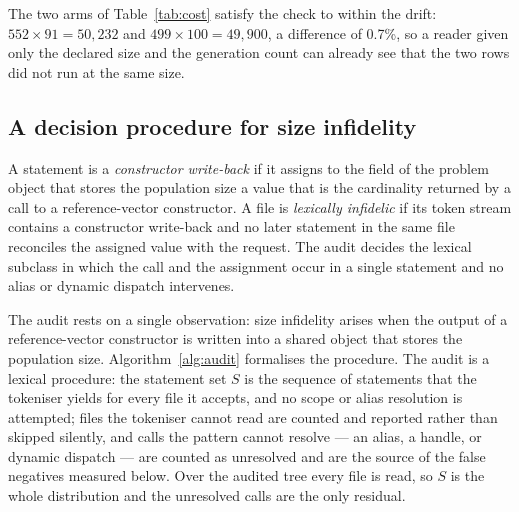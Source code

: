 \documentclass{SCIS2026}
\begin{document}
The two arms of Table~\ref{tab:cost} satisfy the check to within the drift: $552\times91=50{,}232$ and $499\times100=49{,}900$, a difference of 0.7\%, so a reader given only the declared size and the generation count can already see that the two rows did not run at the same size.

\subsection{A decision procedure for size infidelity}
\begin{definition}\label{def:pattern}
A statement is a \emph{constructor write-back} if it assigns to the field of the problem object that stores the population size a value that is the cardinality returned by a call to a reference-vector constructor. A file is \emph{lexically infidelic} if its token stream contains a constructor write-back and no later statement in the same file reconciles the assigned value with the request. The audit decides the lexical subclass in which the call and the assignment occur in a single statement and no alias or dynamic dispatch intervenes.
\end{definition}

\label{sec:audit-proc}
The audit rests on a single observation: size infidelity arises when the output of a reference-vector constructor is written into a shared object that stores the population size. Algorithm~\ref{alg:audit} formalises the procedure. The audit is a lexical procedure: the statement set $S$ is the sequence of statements that the tokeniser yields for every file it accepts, and no scope or alias resolution is attempted; files the tokeniser cannot read are counted and reported rather than skipped silently, and calls the pattern cannot resolve --- an alias, a handle, or dynamic dispatch --- are counted as unresolved and are the source of the false negatives measured below. Over the audited tree every file is read, so $S$ is the whole distribution and the unresolved calls are the only residual.
\end{document}
